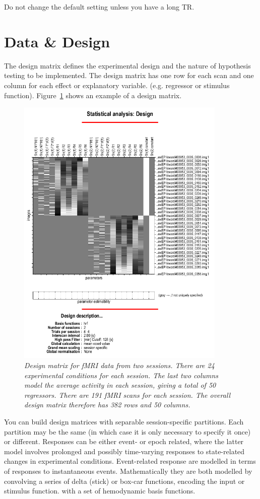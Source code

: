 \documentclass[a4paper,titlepage]{book}
\begin{document}
                                                                                                            

Do not change the default setting unless you have a long TR. 


\section{Data \& Design}
The design matrix defines the experimental design and the nature of hypothesis testing to be implemented.  The design matrix has one row for each scan and one column for each effect or explanatory variable. (e.g. regressor or stimulus function).  Figure~\ref{design} shows an example
of a design matrix.

\begin{figure}
\includegraphics[width=100mm]{design}
\caption{\em Design matrix for fMRI data from two sessions. 
There are 24 experimental conditions for each session. The last two columns 
model the average activity in each session, giving a total of 50 regressors.
There are 191 fMRI scans for each session. The overall design matrix 
therefore has 382 rows and 50 columns. \label{design}}
\end{figure}

You can build design matrices with separable session-specific partitions.  Each partition may be the same (in which case it is only necessary to specify it once) or different.  Responses can be either event- or epoch related, where the latter model involves prolonged and possibly time-varying responses to state-related changes in experimental conditions.  Event-related response are modelled in terms of responses to instantaneous events.  Mathematically they are both modelled by convolving a series of delta (stick) or box-car functions, encoding the input or stimulus function. with a set of hemodynamic basis functions.
\end{document}
